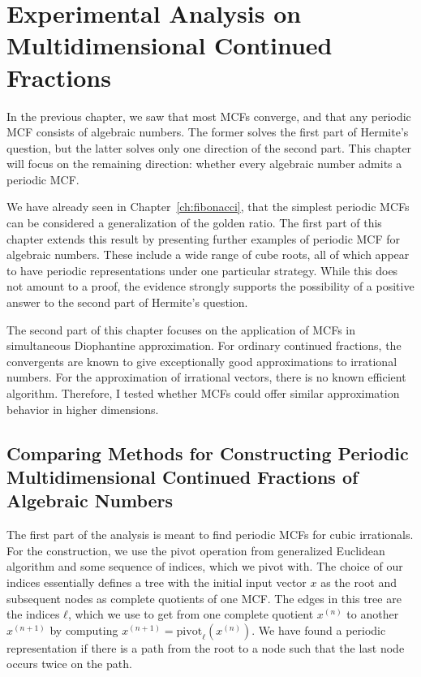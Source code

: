 \chapter{Experimental Analysis on Multidimensional Continued Fractions}
\label{ch:implementation}

In the previous chapter, we saw that most MCFs converge,
and that any periodic MCF consists of algebraic numbers.
The former solves the first part of Hermite's question, but the latter solves
only one direction of the second part.
This chapter will focus on the remaining direction:
whether every algebraic number admits a periodic MCF.

We have already seen in Chapter~\ref{ch:fibonacci},
that the simplest periodic MCFs can be considered a generalization of the
golden ratio.
The first part of this chapter extends this result by presenting further
examples of periodic MCF for algebraic numbers.
These include a wide range of cube roots,
all of which appear to have periodic representations under one particular strategy.
While this does not amount to a proof, the evidence strongly supports
the possibility of a positive answer to the second part of Hermite’s question.

The second part of this chapter focuses on the application of MCFs in simultaneous Diophantine approximation.
For ordinary continued fractions, the convergents are known to give
exceptionally good approximations to irrational numbers.
For the approximation of irrational vectors, there is no known efficient algorithm.
Therefore, I tested whether MCFs could offer similar approximation behavior in higher dimensions.

\section{Comparing Methods for Constructing Periodic Multidimensional Continued Fractions of Algebraic Numbers}
\label{sec:comparison}

The first part of the analysis is meant to find periodic MCFs for cubic
irrationals.
For the construction, we use the $\mathrm{pivot}$ operation from generalized
Euclidean algorithm and some sequence of indices, which we pivot with.
The choice of our indices essentially defines a tree
with the initial input vector $x$ as the root
and subsequent nodes as complete quotients of one MCF.
The edges in this tree are the indices $ℓ$, which we use to get from one
complete quotient $x^{(n)}$ to another $x^{(n+1)}$ by computing $x^{(n+1)} =
\mathrm{pivot}_ℓ(x^{(n)})$.
We have found a periodic representation if there is a path from the root to a
node such that the last node occurs twice on the path.

